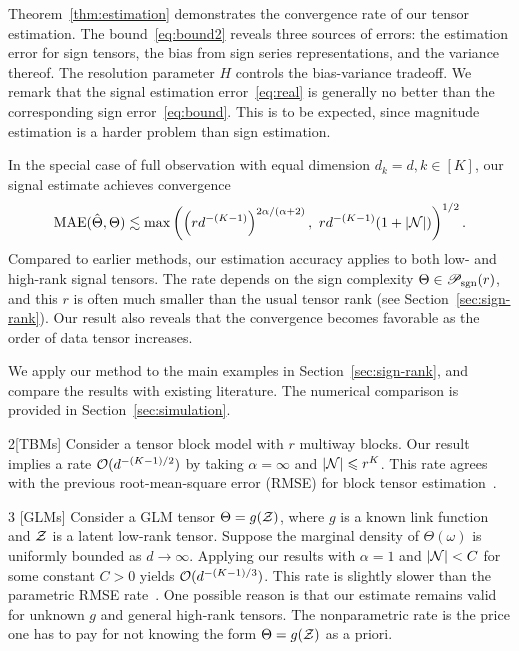 \documentclass[useAMS,usenatbib,usegraphicx,referee]{biom}
\theoremstyle{plain}
\theoremstyle{definition}
\def\caliP{\mathscr{P}_{\textup{sgn}}}
\begin{document}
Theorem~\ref{thm:estimation} demonstrates the convergence rate of our tensor estimation. The bound~\eqref{eq:bound2} reveals three sources of errors: the estimation error for sign tensors, the bias from sign series representations, and the variance thereof. The resolution parameter $H$ controls the bias-variance tradeoff. We remark that the signal estimation error~\eqref{eq:real} is generally no better than the corresponding sign error~\eqref{eq:bound}. This is to be expected, since magnitude estimation is  a harder problem than sign estimation. 

In the special case of full observation with equal dimension $d_k=d, k\in[K]$, our signal estimate achieves convergence
\begin{equation}
\textup{MAE}(\hat \Theta, \Theta)\lesssim\max\left( \left(rd^{-(K-1)}\right)^{2\alpha /( \alpha+2)},\ rd^{-(K-1)}(1+|\mathcal{N}|)\right)^{1/2}.
\end{equation}
Compared to earlier methods, our estimation accuracy applies to both low- and high-rank signal tensors. The rate depends on the sign complexity $\Theta\in\caliP(r)$, and this $r$ is often much smaller than the usual tensor rank (see Section~\ref{sec:sign-rank}). Our result also reveals that the convergence becomes favorable as the order of data tensor increases. 

We apply our method to the main examples in Section~\ref{sec:sign-rank}, and compare the results with existing literature. The numerical comparison is provided in Section~\ref{sec:simulation}. 
\vspace{-.3cm}

\begin{customexample}{2}[TBMs]
Consider a tensor block model with $r$ multiway blocks. Our result implies a rate $\mathcal{O}(d^{-(K-1)/2})$ by taking $\alpha=\infty$ and $|\mathcal{N}| \leqslant r^K$. This rate agrees with the  previous root-mean-square error (RMSE) for block tensor estimation~\citep{wang2019multiway}.
\end{customexample}
\vspace{-.3cm}

\begin{customexample}{3} [GLMs] 
Consider a GLM tensor $\Theta=g(\mathcal{Z})$, where $g$ is a known link function and $\mathcal{Z}$ is a latent low-rank tensor. Suppose the marginal density of $\Theta(\omega)$ is uniformly bounded as $d\to\infty$. Applying our results with $\alpha=1$ and $|\mathcal{N}|<C$ for some constant $C>0$ yields $\mathcal{O}(d^{-(K-1)/3})$. This rate is slightly slower than the parametric RMSE rate~\citep{zhang2018tensor,wang2018learning}. One possible reason is that our estimate remains valid for unknown $g$ and general high-rank tensors. The nonparametric rate is the price one has to pay for not knowing the form $\Theta=g(\mathcal{Z})$ as a priori. 
\end{customexample}
\end{document}
